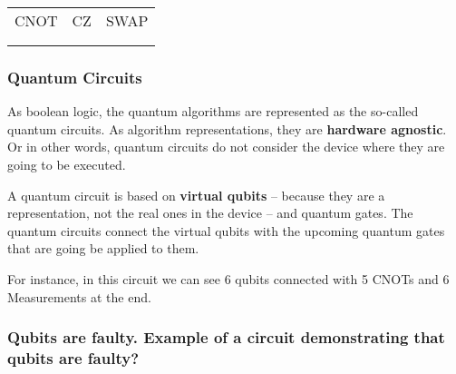 \documentclass[11pt]{article}
\begin{document}
\begin{center}
\begin{tabular}{lll}
CNOT & CZ & SWAP\\
 &  & \\
 &  & \\
\end{tabular}
\end{center}


\subsubsection{Quantum Circuits}
\label{sec:org79a6fca}

As boolean logic, the quantum algorithms are represented as the so-called quantum circuits.
As algorithm representations, they are \textbf{hardware agnostic}.
Or in other words, quantum circuits do not consider the device where they are going to be executed.

A quantum circuit is based on \textbf{virtual qubits} -- because they are a representation, not the real ones in the device -- and quantum gates.
The quantum circuits connect the virtual qubits with the upcoming quantum gates that are going be applied to them.

For instance, in this circuit we can see 6 qubits connected with 5 CNOTs and 6 Measurements at the end.

\begin{figure}[H]
    \centering

\end{figure}


\subsubsection{Qubits are faulty. Example of a circuit demonstrating that qubits are faulty?}
\label{sec:org2ddf9c0}
\end{document}
